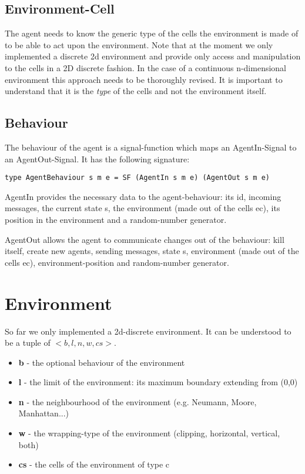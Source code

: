 \subsection{Environment-Cell}
The agent needs to know the generic type of the cells the environment is made of to be able to act upon the environment. Note that at the moment we only implemented a discrete 2d environment and provide only access and manipulation to the cells in a 2D discrete fashion. In the case of a continuous n-dimensional environment this approach needs to be thoroughly revised. It is important to understand that it is the \textit{type} of the cells and not the environment itself.

\subsection{Behaviour}
The behaviour of the agent is a signal-function which maps an AgentIn-Signal to an AgentOut-Signal. It has the following signature: 
\begin{lstlisting}[]
type AgentBehaviour s m e = SF (AgentIn s m e) (AgentOut s m e)
\end{lstlisting}

AgentIn provides the necessary data to the agent-behaviour: its id, incoming messages, the current state s, the environment (made out of the cells ec), its position in the environment and a random-number generator. 

AgentOut allows the agent to communicate changes out of the behaviour: kill itself, create new agents, sending messages, state s, environment (made out of the cells ec), environment-position and random-number generator. 

\section{Environment}
So far we only implemented a 2d-discrete environment. It can be understood to be a tuple of $<b, l, n, w, cs>$.
\begin{itemize}
	\item \textbf{b} - the optional behaviour of the environment
	\item \textbf{l} - the limit of the environment: its maximum boundary extending from (0,0)
	\item \textbf{n} - the neighbourhood of the environment (e.g. Neumann, Moore, Manhattan...)
	\item \textbf{w} - the wrapping-type of the environment (clipping, horizontal, vertical, both)
	\item \textbf{cs} - the cells of the environment of type c
\end{itemize}

